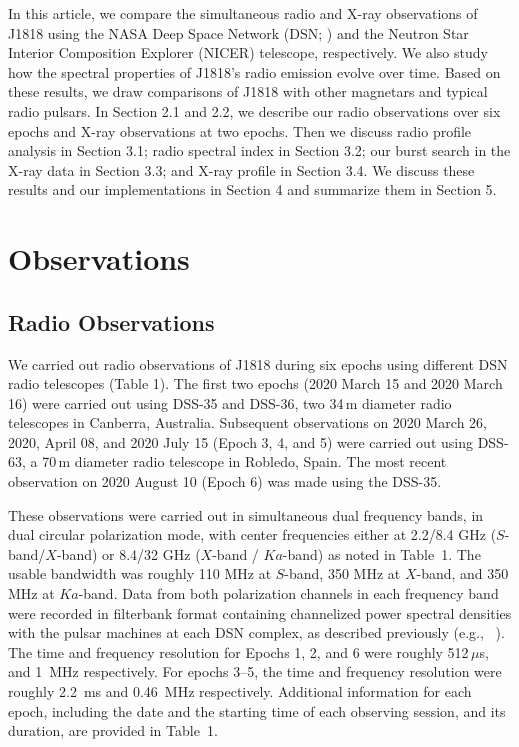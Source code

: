 \documentclass[twocolumn]{emulateapj}
\begin{document}
In this article, we compare the simultaneous radio and X-ray observations of J1818 using the NASA Deep Space Network (DSN; \citealt{pearlman2019b}) and the Neutron Star Interior Composition Explorer (NICER) telescope, respectively. We also study how the spectral properties of J1818's radio emission evolve over time. Based on these results, we draw comparisons of J1818 with other magnetars and typical radio pulsars. In Section 2.1 and 2.2, we describe our radio observations over six epochs and X-ray observations at two epochs. Then we discuss radio profile analysis in Section 3.1; radio spectral index in Section 3.2; our burst search in the X-ray data in Section 3.3; and X-ray profile in Section 3.4. We discuss these results and our implementations in Section 4 and summarize them in Section 5.

\section{Observations}
\subsection{Radio Observations}

We carried out radio observations of J1818 during six epochs using different DSN radio telescopes (Table 1). The first two epochs (2020 March 15 and 2020 March 16) were carried out using DSS-35 and DSS-36, two 34\,m diameter radio telescopes in Canberra, Australia. Subsequent observations on 2020 March 26, 2020, April 08, and 2020 July 15 (Epoch 3, 4, and 5) were carried out using DSS-63, a 70\,m diameter radio telescope in Robledo, Spain. The most recent observation on 2020 August 10 (Epoch 6) was made using the DSS-35.

These observations were carried out in simultaneous dual frequency bands, in dual circular polarization mode, with center frequencies either at 2.2/8.4 GHz ($S$-band/$X$-band) or 8.4/32 GHz ($X$-band / $Ka$-band) as noted in Table~1. The usable bandwidth was roughly 110 MHz at $S$-band, 350 MHz at $X$-band, and 350 MHz at $Ka$-band. Data from both polarization channels in each frequency band were recorded in filterbank format containing channelized power spectral densities with the pulsar machines at each DSN complex, as described previously (e.g., ~\citealt{pearlman2018, pearlman2019b, Majid+2020, pearlman2020bright}). The time and frequency resolution for Epochs 1, 2, and 6 were roughly 512\,$\mu$s, and 1\, MHz respectively. For epochs 3--5, the time and frequency resolution were roughly 2.2\, ms and 0.46\, MHz respectively. Additional information for each epoch, including the date and the starting time of each observing session, and its duration, are provided in Table~1.
\end{document}
